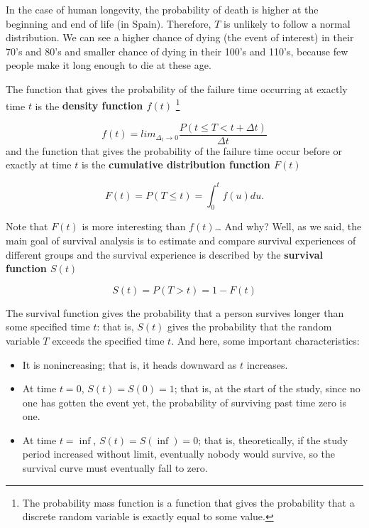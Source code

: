 \documentclass[]{book}
\let\rmarkdownfootnote\footnote%
\def\footnote{\protect\rmarkdownfootnote}
\theoremstyle{definition}
\theoremstyle{definition}
\theoremstyle{definition}
\theoremstyle{remark}
\begin{document}
In the case of human longevity, the probability of death is higher at
the beginning and end of life (in Spain). Therefore, \(T\) is unlikely
to follow a normal distribution. We can see a higher chance of dying
(the event of interest) in their 70's and 80's and smaller chance of
dying in their 100's and 110's, because few people make it long enough
to die at these age.

The function that gives the probability of the failure time occurring at
exactly time \(t\) is the \textbf{density function \(f(t)\)} \footnote{The
  probability mass function is a function that gives the probability
  that a discrete random variable is exactly equal to some value.}

\[
f(t) = \displaystyle{lim_{\Delta_t \to 0}} \frac{P(t \le T < t + \Delta t)}{\Delta t}
\] and the function that gives the probability of the failure time occur
before or exactly at time \(t\) is the \textbf{cumulative distribution
function \(F(t)\)}

\[
F(t) = P(T \le t) = \int_{0}^{t} f(u) du.
\]

Note that \(F(t)\) is more interesting than \(f(t)\)\ldots{} And why?
Well, as we said, the main goal of survival analysis is to estimate and
compare survival experiences of different groups and the survival
experience is described by the \textbf{survival function \(S(t)\)}

\[
S(t) = P(T > t) = 1 - F(t)
\]

The survival function gives the probability that a person survives
longer than some specified time \(t\): that is, \(S(t)\) gives the
probability that the random variable \(T\) exceeds the specified time
\(t\). And here, some important characteristics:

\begin{itemize}
\item
  It is nonincreasing; that is, it heads downward as \(t\) increases.
\item
  At time \(t = 0\), \(S(t) = S(0)= 1\); that is, at the start of the
  study, since no one has gotten the event yet, the probability of
  surviving past time zero is one.
\item
  At time \(t = \inf\), \(S(t) = S(\inf) = 0\); that is, theoretically,
  if the study period increased without limit, eventually nobody would
  survive, so the survival curve must eventually fall to zero.
\end{itemize}
\end{document}
